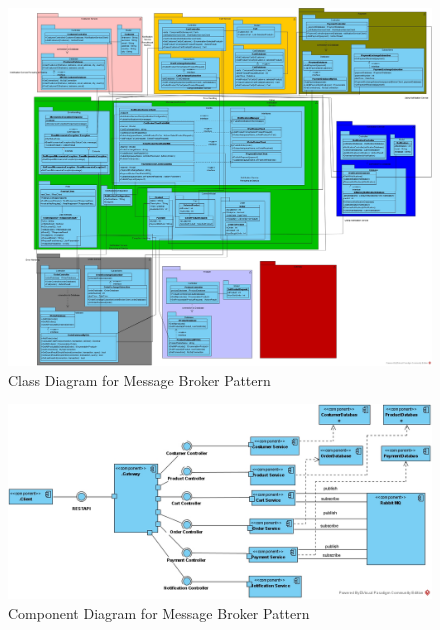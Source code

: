 \documentclass{article}
\begin{document}
\pagebreak

\begin{figure}[h!]
\centering
\includegraphics[scale=0.20, angle=90]{Class_MessageBroker.jpg}
\caption{Class Diagram for Message Broker Pattern}
\label{fig:class_broker}
\end{figure}

\pagebreak

\begin{figure}[h!]
\centering
\includegraphics[scale=0.45, angle=90]{Comp_Message Broker.jpg}
\caption{Component Diagram for Message Broker Pattern}
\label{fig:comp_broker}
\end{figure}

\pagebreak
\end{document}
